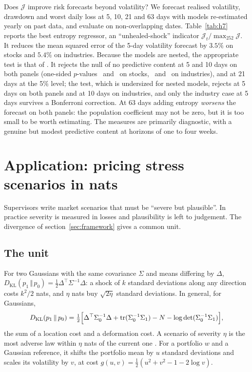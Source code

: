 \documentclass[12pt]{article}
\theoremstyle{definition}
\theoremstyle{remark}
\newcommand{\JJ}{\mathcal{J}}
\newcommand{\KL}[2]{D_{\mathrm{KL}}\!\left(#1\,\Vert\,#2\right)}
\begin{document}
\begin{doublespace}
Does $\JJ$ improve risk forecasts beyond volatility? We forecast realised
volatility, drawdown and worst daily loss at 5, 10, 21 and 63 days with
models re-estimated yearly on past data, and evaluate on non-overlapping
dates. Table~\ref{tab:h7} reports the best entropy regressor, an
``unhealed-shock'' indicator $\JJ_t/\max_{252}\JJ$. It reduces the mean
squared error of the 5-day volatility forecast by $3.5\%$ on stocks and $5.4\%$
on industries. Because the models are nested, the appropriate test is that of
\citet{clarkwest2007}. It rejects the null of no predictive content at 5 and
10 days on both panels (one-sided $p$-values \cwSpFive\ and \cwSpTen\ on
stocks, \cwFfFive\ and \cwFfTen\ on industries), and at 21 days at the 5\%
level; the \citet{dm1995} test, which is undersized for nested models, rejects
at 5 days on both panels and at 10 days on industries, and only the
industry case at 5 days survives a Bonferroni correction. At
63 days adding entropy \emph{worsens} the forecast on both panels: the
population coefficient may not be zero, but it is too small to be worth
estimating. The measures are primarily diagnostic, with a genuine but modest
predictive content at horizons of one to four weeks.

\section{Application: pricing stress scenarios in nats}
\label{sec:stress}

Supervisors write market scenarios that must be ``severe but plausible''. In
practice severity is measured in losses and plausibility is left to judgement.
The divergence of section~\ref{sec:framework} gives a common unit.

\subsection{The unit}

For two Gaussians with the same covariance $\Sigma$ and means differing by
$\Delta$, $\KL{p_1}{p_0}=\tfrac12\Delta^\top\Sigma^{-1}\Delta$: a shock of $k$
standard deviations along any direction costs $k^2/2$ nats, and $\eta$ nats buy
$\sqrt{2\eta}$ standard deviations. In general, for Gaussians,
\begin{equation}
\label{eq:klgauss}
\KL{p_1}{p_0}=\tfrac12\Bigl[\Delta^\top\Sigma_0^{-1}\Delta
+\mathrm{tr}(\Sigma_0^{-1}\Sigma_1)-N-\log\det(\Sigma_0^{-1}\Sigma_1)\Bigr],
\end{equation}
the sum of a location cost and a deformation cost. A scenario of severity
$\eta$ is the most adverse law within $\eta$ nats of the current one
\citep{breuer2013,glasserman2014}. For a portfolio $w$ and a Gaussian
reference, it shifts the portfolio mean by $u$ standard deviations and scales
its volatility by $v$, at cost $g(u,v)=\tfrac12(u^2+v^2-1-2\log v)$.


\end{doublespace}
\end{document}
